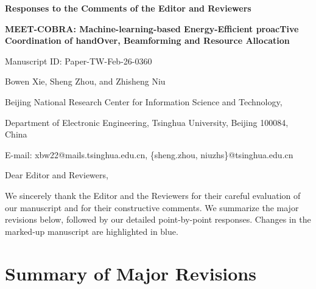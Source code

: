 \documentclass[11pt]{article}
\begin{document}
\begin{center}
  {\Large\bfseries Responses to the Comments of the Editor and Reviewers}\par
  \vspace{0.8em}
  {\large\bfseries MEET-COBRA: Machine-learning-based Energy-Efficient proacTive\\
  Coordination of handOver, Beamforming and Resource Allocation}\par
  \vspace{0.6em}
  {\large Manuscript ID: Paper-TW-Feb-26-0360}\par
  \vspace{0.8em}
  Bowen Xie, Sheng Zhou, and Zhisheng Niu\par
  Beijing National Research Center for Information Science and Technology,\par
  Department of Electronic Engineering, Tsinghua University, Beijing 100084, China\par
  E-mail: xbw22@mails.tsinghua.edu.cn, \{sheng.zhou, niuzhs\}@tsinghua.edu.cn
\end{center}

\vspace{0.8em}

Dear Editor and Reviewers,

We sincerely thank the Editor and the Reviewers for their careful evaluation of our manuscript
and for their constructive comments. We summarize the major revisions
below, followed by our detailed point-by-point responses. Changes in the
marked-up manuscript are highlighted in blue.

\section*{Summary of Major Revisions}
\end{document}
